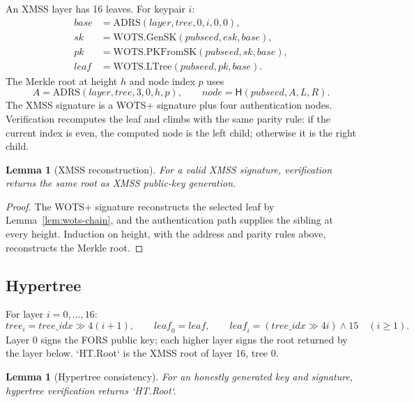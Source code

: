 \documentclass[11pt,a4paper]{article}
\theoremstyle{plain}
\newtheorem{lemma}[theorem]{Lemma}
\theoremstyle{definition}
\theoremstyle{remark}
\newcommand{\Hash}{\mathsf{H}}
\begin{document}
An XMSS layer has 16 leaves.  For keypair $i$:
\[
 \begin{aligned}
 \mathit{base}&=\mathrm{ADRS}(\mathit{layer},\mathit{tree},0,i,0,0),\\
 \mathit{sk}&=\mathrm{WOTS.GenSK}(\mathit{pubseed},\mathit{esk},
   \mathit{base}),\\
 \mathit{pk}&=\mathrm{WOTS.PKFromSK}(\mathit{pubseed},\mathit{sk},
   \mathit{base}),\\
 \mathit{leaf}&=\mathrm{WOTS.LTree}(\mathit{pubseed},\mathit{pk},
   \mathit{base}).
 \end{aligned}
\]
The Merkle root at height $h$ and node index $p$ uses
\[
 A=\mathrm{ADRS}(\mathit{layer},\mathit{tree},3,0,h,p),
 \qquad
 \mathit{node}=\Hash(\mathit{pubseed},A,L,R).
\]
The XMSS signature is a WOTS+ signature plus four authentication
nodes.  Verification recomputes the leaf and climbs with the same
parity rule: if the current index is even, the computed node is the left
child; otherwise it is the right child.

\begin{lemma}[XMSS reconstruction]
\label{lem:xmss}
For a valid XMSS signature, verification returns the same root as
XMSS public-key generation.
\end{lemma}

\begin{proof}
The WOTS+ signature reconstructs the selected leaf by
Lemma~\ref{lem:wots-chain}, and the authentication path supplies the sibling at every
height.  Induction on height, with the address and parity rules above,
reconstructs the Merkle root.
\end{proof}

\subsection{Hypertree}

For layer $i=0,\ldots,16$:
\[
 \mathit{tree}_i=\mathit{tree\_idx}\gg4(i+1),\qquad
 \mathit{leaf}_0=\mathit{leaf},\qquad
 \mathit{leaf}_i=(\mathit{tree\_idx}\gg4i)\land15
 \quad(i\ge1).
\]
Layer 0 signs the FORS public key; each higher layer signs the root
returned by the layer below.  `HT.Root` is the XMSS root of layer 16,
tree 0.

\begin{lemma}[Hypertree consistency]
\label{lem:ht}
For an honestly generated key and signature, hypertree verification
returns `HT.Root`.
\end{lemma}
\end{document}
